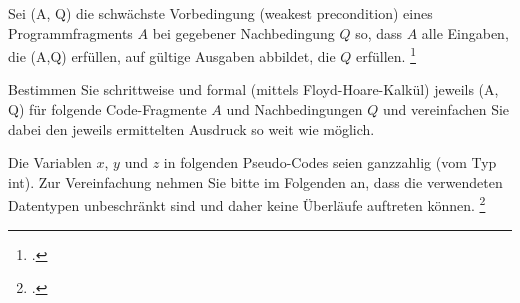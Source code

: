 \documentclass{bschlangaul-aufgabe}
\begin{document}

\let\wp=\bWpKalkuel
\let\equivalent=\bWpEquivalent
\let\erklaerung=\bWpErklaerung
\def\m#1{\textcolor{blue}{#1}}
\def\k#1{\hfill{\scriptsize(#1)}}

Sei (A, Q) die schwächste Vorbedingung (weakest precondition)
eines Programmfragments $A$ bei gegebener Nachbedingung $Q$ so, dass $A$
alle Eingaben, die (A,Q) erfüllen, auf gültige Ausgaben
abbildet, die $Q$ erfüllen.
\footcite{examen:46116:2015:09}

Bestimmen Sie schrittweise und formal (mittels Floyd-Hoare-Kalkül)
jeweils (A, Q) für folgende Code-Fragmente $A$ und
Nachbedingungen $Q$ und vereinfachen Sie dabei den jeweils ermittelten
Ausdruck so weit wie möglich.

Die Variablen $x$, $y$ und $z$ in folgenden Pseudo-Codes seien
ganzzahlig (vom Typ int). Zur Vereinfachung nehmen Sie bitte im
Folgenden an, dass die verwendeten Datentypen unbeschränkt sind und
daher keine Überläufe auftreten können.
\footcite{sosy:pu:5:4}
\end{document}
